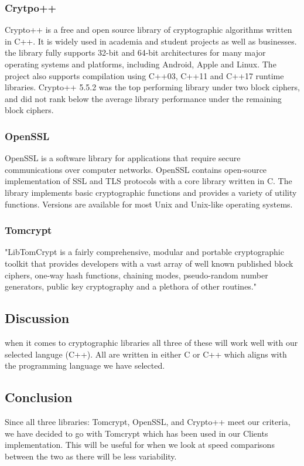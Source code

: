 \subsubsection{ Crytpo++ }
Crypto++ is a free and open source library of cryptographic algorithms written in C++. It is widely used in academia and student projects as well as businesses.  the library fully supports 32-bit and 64-bit architectures for many major operating systems and platforms, including Android, Apple and Linux. The project also supports compilation using C++03, C++11 and C++17 runtime libraries. Crypto++ 5.5.2 was the top performing library under two block ciphers, and did not rank below the average library performance under the remaining block ciphers.

\subsubsection{ OpenSSL }
OpenSSL is a software library for applications that require secure communications over computer networks. OpenSSL contains open-source implementation of SSL and TLS protocols with a core library written in C. The library implements basic cryptographic functions and provides a variety of utility functions. Versions are available for most Unix and Unix-like operating systems.

\subsubsection{ Tomcrypt }
"LibTomCrypt is a fairly comprehensive, modular and portable cryptographic toolkit that provides developers with a vast array of well known published block ciphers, one-way hash functions, chaining modes, pseudo-random number generators, public key cryptography and a plethora of other routines." 
     
\subsection{Discussion}     
when it comes to cryptographic libraries all three of these will work well with our selected languge (C++). All are written in either C or C++ which aligns with the programming language we have selected.  

\subsection{Conclusion}
Since all three libraries: Tomcrypt, OpenSSL, and Crypto++ meet our criteria, we have decided to go with Tomcrypt which has been used in our Clients implementation. This will be useful for when we look at speed comparisons between the two as there will be less variability.  

